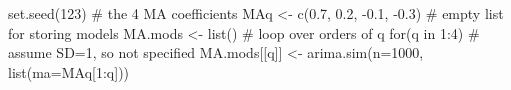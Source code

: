 \begin{Schunk}
\begin{Sinput}
 set.seed(123)
 # the 4 MA coefficients
 MAq <- c(0.7, 0.2, -0.1, -0.3)
 # empty list for storing models
 MA.mods <- list()
 # loop over orders of q
 for(q in 1:4) {
   # assume SD=1, so not specified
   MA.mods[[q]] <- arima.sim(n=1000, list(ma=MAq[1:q]))
 }
\end{Sinput}
\end{Schunk}
